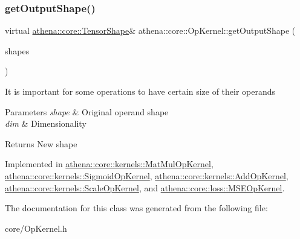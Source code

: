 \mbox{\label{classathena_1_1core_1_1_op_kernel_a762e541463ffd089b47a8e6755c30fe1}} 
\subsubsection{\texorpdfstring{get\+Output\+Shape()}{getOutputShape()}}
{\footnotesize\ttfamily virtual \mbox{\hyperlink{classathena_1_1core_1_1_tensor_shape}{athena\+::core\+::\+Tensor\+Shape}}\& athena\+::core\+::\+Op\+Kernel\+::get\+Output\+Shape (\begin{DoxyParamCaption}\item[{std\+::vector$<$ \mbox{\hyperlink{classathena_1_1core_1_1_tensor_shape}{athena\+::core\+::\+Tensor\+Shape}} $>$ \&}]{shapes }\end{DoxyParamCaption})\hspace{0.3cm}{\ttfamily [pure virtual]}}

It is important for some operations to have certain size of their operands 
\begin{DoxyParams}{Parameters}
{\em shape} & Original operand shape \\
\hline
{\em dim} & Dimensionality \\
\hline
\end{DoxyParams}
\begin{DoxyReturn}{Returns}
New shape 
\end{DoxyReturn}


Implemented in \mbox{\hyperlink{classathena_1_1core_1_1kernels_1_1_mat_mul_op_kernel_a3a397257c208f55ba5fba4018112a605}{athena\+::core\+::kernels\+::\+Mat\+Mul\+Op\+Kernel}}, \mbox{\hyperlink{classathena_1_1core_1_1kernels_1_1_sigmoid_op_kernel_abd929f41de55a4898a0fce70025c1499}{athena\+::core\+::kernels\+::\+Sigmoid\+Op\+Kernel}}, \mbox{\hyperlink{classathena_1_1core_1_1kernels_1_1_add_op_kernel_a687d68d7374e9546f01cefcbfb382d04}{athena\+::core\+::kernels\+::\+Add\+Op\+Kernel}}, \mbox{\hyperlink{classathena_1_1core_1_1kernels_1_1_scale_op_kernel_ad1791a60026e90c95f248202e1404a26}{athena\+::core\+::kernels\+::\+Scale\+Op\+Kernel}}, and \mbox{\hyperlink{classathena_1_1core_1_1loss_1_1_m_s_e_op_kernel_a23aacffbbc73b177535511702f3c441d}{athena\+::core\+::loss\+::\+M\+S\+E\+Op\+Kernel}}.



The documentation for this class was generated from the following file\+:\begin{DoxyCompactItemize}
\item 
core/Op\+Kernel.\+h\end{DoxyCompactItemize}
